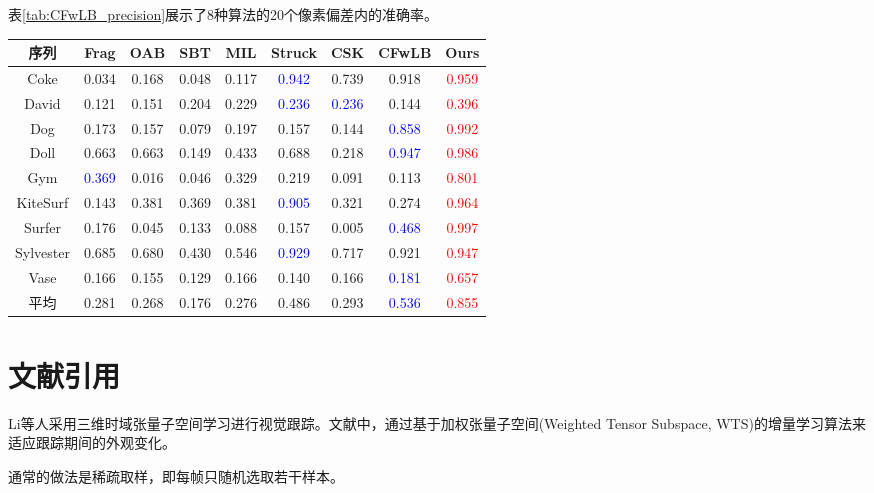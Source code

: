 表\ref{tab:CFwLB_precision}展示了8种算法的20个像素偏差内的准确率。
~\\
\begin{table*}[htbp]
\centering
\renewcommand{\arraystretch}{1.5}
\caption{8种算法20个像素偏差内的准确率}
    \begin{tabular}{|c|c|c|c|c|c|c|c|c|}
        \hline
        序列  & Frag  &  OAB  &  SBT  &  MIL  & Struck & CSK   & CFwLB   &  Ours \\ \hline
        
        Coke      & 0.034 & 0.168 & 0.048  & 0.117 & \textcolor{blue}{0.942} & 0.739 & 0.918   & \textcolor{red}{0.959}  \\ \hline
        David     & 0.121 & 0.151 & 0.204  & 0.229 & \textcolor{blue}{0.236} & \textcolor{blue}{0.236} & 0.144   & \textcolor{red}{0.396} \\ \hline
        Dog       & 0.173 & 0.157 & 0.079  & 0.197 & 0.157 & 0.144 & \textcolor{blue}{0.858}   & \textcolor{red}{0.992}  \\ \hline
        Doll      & 0.663 & 0.663 & 0.149  & 0.433 & 0.688 & 0.218 & \textcolor{blue}{0.947}& \textcolor{red}{ 0.986} \\ \hline
        Gym       & \textcolor{blue}{0.369} & 0.016 & 0.046  & 0.329 & 0.219 & 0.091 & 0.113   & \textcolor{red}{0.801}  \\ \hline
        KiteSurf  & 0.143 & 0.381 & 0.369  & 0.381 & \textcolor{blue}{0.905} & 0.321 & 0.274   & \textcolor{red}{0.964}  \\ \hline
        Surfer    & 0.176 & 0.045 & 0.133  & 0.088 & 0.157 & 0.005  & \textcolor{blue}{0.468}   & \textcolor{red}{0.997}  \\ \hline
    Sylvester     & 0.685 & 0.680 & 0.430  & 0.546 & \textcolor{blue}{0.929} & 0.717 & 0.921 & \textcolor{red}{0.947}\\ \hline
        Vase      & 0.166 & 0.155 & 0.129  & 0.166 & 0.140 & 0.166  & \textcolor{blue}{0.181}   & \textcolor{red}{0.657}  \\ \hline \hline

        平均      &0.281  & 0.268 & 0.176  & 0.276 & 0.486 & 0.293  & \textcolor{blue}{0.536}& \textcolor{red}{0.855} \\ \hline
\end{tabular}
\label{tab:CFwLB_precision}
\end{table*}
\setlength{\baselineskip}{20pt}


\section{文献引用}

Li等\cite{li2007robust}人采用三维时域张量子空间学习进行视觉跟踪。文献中，通过基于加权张量子空间(Weighted Tensor Subspace, WTS)的增量学习算法来适应跟踪期间的外观变化。

通常的做法是稀疏取样，即每帧只随机选取若干样本\cite{Zhang2012Real,kalal2012tracking,babenko2011robust,saffari2009line,hare2016struck}。

